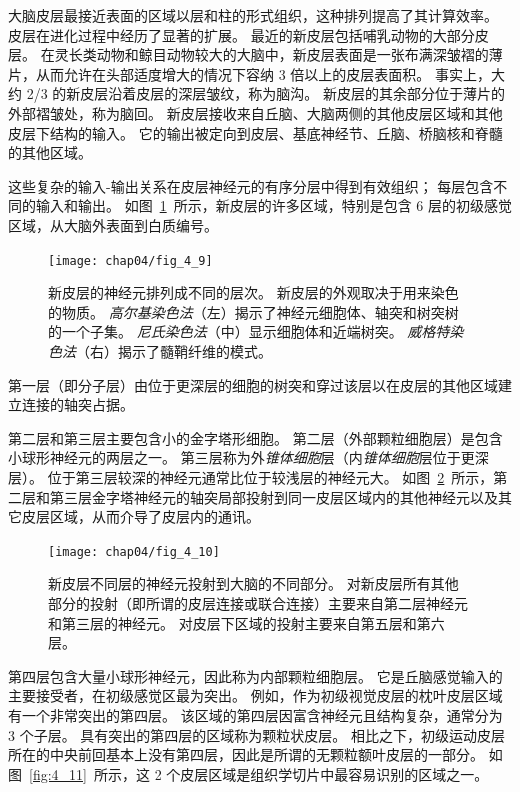 大脑皮层最接近表面的区域以层和柱的形式组织，这种排列提高了其计算效率。 
皮层在进化过程中经历了显著的扩展。 
最近的新皮层包括哺乳动物的大部分皮层。 
在灵长类动物和鲸目动物较大的大脑中，新皮层表面是一张布满深皱褶的薄片，从而允许在头部适度增大的情况下容纳 3 倍以上的皮层表面积。
事实上，大约 2/3 的新皮层沿着皮层的深层皱纹，称为脑沟。
新皮层的其余部分位于薄片的外部褶皱处，称为脑回。 
新皮层接收来自丘脑、大脑两侧的其他皮层区域和其他皮层下结构的输入。 
它的输出被定向到皮层、基底神经节、丘脑、桥脑核和脊髓的其他区域。


这些复杂的输入-输出关系在皮层神经元的有序分层中得到有效组织； 每层包含不同的输入和输出。 
如图~\ref{fig:4_9}~所示，新皮层的许多区域，特别是包含 6 层的初级感觉区域，从大脑外表面到白质编号。

\begin{figure}[htbp]
	\centering
	\texttt{[image: chap04/fig\_4\_9]}
	\caption{新皮层的神经元排列成不同的层次。 
		新皮层的外观取决于用来染色的物质。 
		\textit{高尔基染色法}（左）揭示了神经元细胞体、轴突和树突树的一个子集。 
		\textit{尼氏染色法}（中）显示细胞体和近端树突。
		\textit{威格特染色法}（右）揭示了髓鞘纤维的模式\cite{heimer2012human}。}
	\label{fig:4_9}
\end{figure}


第一层（即分子层）由位于更深层的细胞的树突和穿过该层以在皮层的其他区域建立连接的轴突占据。


第二层和第三层主要包含小的金字塔形细胞。
第二层（外部颗粒细胞层）是包含小球形神经元的两层之一。
第三层称为外\textit{锥体细胞}层（内\textit{锥体细胞}层位于更深层）。
位于第三层较深的神经元通常比位于较浅层的神经元大。 
如图~\ref{fig:4_10}~所示，第二层和第三层金字塔神经元的轴突局部投射到同一皮层区域内的其他神经元以及其它皮层区域，从而介导了皮层内的通讯。

\begin{figure}[htbp]
	\centering
	\texttt{[image: chap04/fig\_4\_10]}
	\caption{新皮层不同层的神经元投射到大脑的不同部分。
		对新皮层所有其他部分的投射（即所谓的皮层连接或联合连接）主要来自第二层神经元和第三层的神经元。
		对皮层下区域的投射主要来自第五层和第六层\cite{jones1986connectivity}。}
	\label{fig:4_10}
\end{figure}


第四层包含大量小球形神经元，因此称为内部颗粒细胞层。 
它是丘脑感觉输入的主要接受者，在初级感觉区最为突出。 
例如，作为初级视觉皮层的枕叶皮层区域有一个非常突出的第四层。
该区域的第四层因富含神经元且结构复杂，通常分为 3 个子层。
具有突出的第四层的区域称为颗粒状皮层。 
相比之下，初级运动皮层所在的中央前回基本上没有第四层，因此是所谓的无颗粒额叶皮层的一部分。
如图~\ref{fig:4_11}~所示，这 2 个皮层区域是组织学切片中最容易识别的区域之一。

